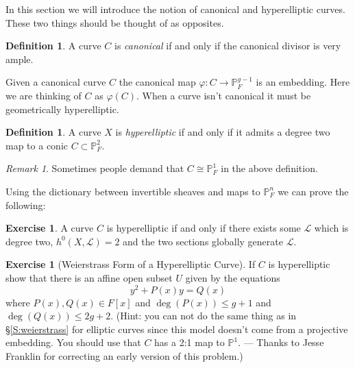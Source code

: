 \documentclass[12pt]{article}
\numberwithin{equation}{section}
\theoremstyle{definition}
\newtheorem{definition}[theorem]{Definition}
\newtheorem{exercise}[theorem]{Exercise}
\theoremstyle{remark}
\newtheorem{remark}[theorem]{Remark}
\newcommand{\PP}{\mathbb{P}}
\newcommand{\Lcal}{\mathcal{L}}
\begin{document}
In this section we will introduce the notion of canonical and hyperelliptic curves. 
These two things should be thought of as opposites. 

\begin{definition}
	A curve $C$ is \emph{canonical} if and only if the canonical divisor is very ample. 	
\end{definition}

Given a canonical curve $C$ the canonical map $\varphi: C \to \PP^{g-1}_F$
is an embedding. 
Here we are thinking of $C$ as $\varphi(C)$.
When a curve isn't canonical it must be geometrically hyperelliptic. 

\begin{definition}
	A curve $X$ is \emph{hyperelliptic} if and only if it admits a degree two map to a conic $C\subset \PP^2_F$.
\end{definition}

\begin{remark}
	Sometimes people demand that $C \cong \PP^1_F$ in the above definition. 
\end{remark}

Using the dictionary between invertible sheaves and maps to $\PP^n_F$ we can prove the following:
\begin{exercise}
	A curve $C$ is hyperelliptic if and only if there exists some $\Lcal$ which is degree two, $h^0(X,\Lcal)=2$ and the two sections globally generate $\Lcal$.
\end{exercise}

\begin{exercise}[Weierstrass Form of a Hyperelliptic Curve]
	If $C$ is hyperelliptic show that there is an affine open subset $U$ given by the equations 
	$$ y^2+P(x)y = Q(x) $$
	where $P(x),Q(x) \in F[x]$ and $\deg(P(x))\leq g+1$ and $\deg(Q(x))\leq 2g+2$.
	(Hint:  you can not do the same thing as in \S\ref{S:weierstrass} for elliptic curves since this model doesn't come from a projective embedding. You should use that $C$ has a 2:1 map to $\PP^1$. ---
	Thanks to Jesse Franklin for correcting an early version of this problem.) 
\end{exercise}
\end{document}

